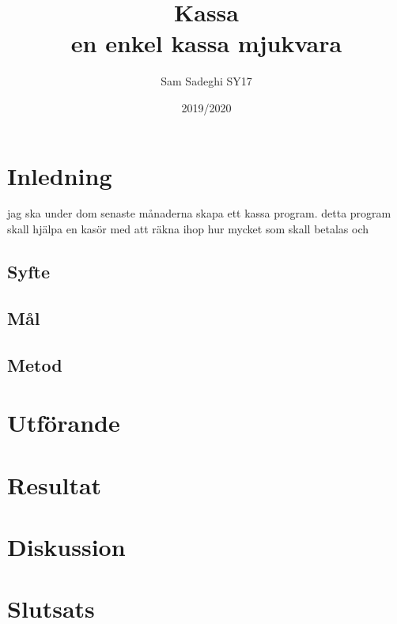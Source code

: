 \documentclass[a4paper, 12pt]{article}
\title{Kassa\\\large en enkel kassa mjukvara}
\author{Sam Sadeghi SY17}
\date{2019/2020}
\begin{document}
\begin{titlepage}
\maketitle
\end{titlepage}
\begin{abstract}

\end{abstract}
\newpage
\tableofcontents
\newpage

\section{Inledning}
jag ska under dom senaste månaderna skapa ett kassa program.
detta program skall hjälpa en kasör med att räkna ihop hur mycket som skall betalas och 
\subsection{Syfte}

\subsection{Mål}

\subsection{Metod}

\section{Utförande}

\section{Resultat}

\section{Diskussion}

\section{Slutsats}

\newpage 

\printbibliography
\end{document}
